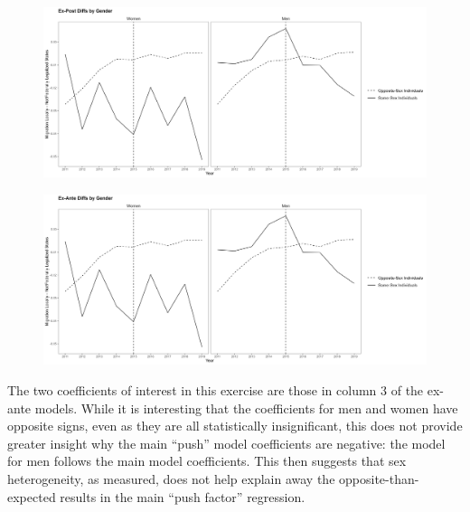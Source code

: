 \documentclass[12pt,letterpaper]{article}
\begin{document}
\begin{figure}[p]
    \centering
    \includegraphics[width=1\linewidth]{outputs/summary_stats/sex_post_diffs.png}
    \caption{}
    \label{fig: sex_post_diffs}
\end{figure}
\begin{figure}[p]
    \centering
    \includegraphics[width=1\linewidth]{outputs/summary_stats/sex_ante_diffs.png}
    \caption{}
    \label{fig: sex_ante_diffs}
\end{figure}

The two coefficients of interest in this exercise are those in column 3 of the ex-ante models. While it is interesting that the coefficients for men and women have opposite signs, even as they are all statistically insignificant, this does not provide greater insight why the main “push” model coefficients are negative: the model for men follows the main model coefficients. This then suggests that sex heterogeneity, as measured, does not help explain away the opposite-than-expected results in the main “push factor” regression.
\end{document}
